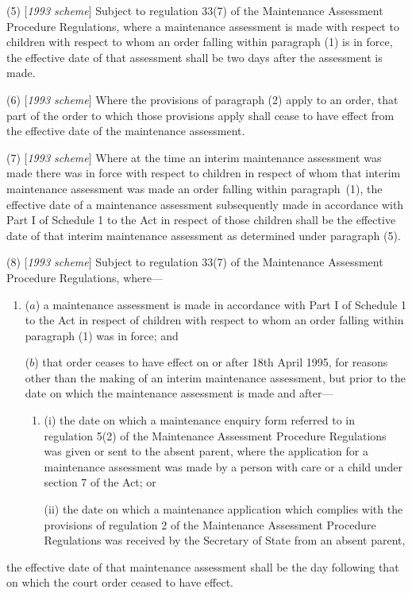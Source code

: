 \documentclass[12pt,a4paper]{article}
\begin{document}
(5) [\emph{1993 scheme}]
Subject to regulation 33(7) of the Maintenance Assessment Procedure Regulations,  %
where a maintenance assessment is made with respect to children with respect to whom an order falling within paragraph (1) is in force, the effective date of that assessment shall be two days after the assessment is made.

(6) [\emph{1993 scheme}] Where the provisions of paragraph (2) apply to an order, that part of the order to which those provisions apply shall cease to have effect from the effective date of the maintenance assessment.

(7) [\emph{1993 scheme}] Where at the time an interim maintenance assessment was made there was in force with respect to children in respect of whom that interim maintenance assessment was made an order falling within paragraph~(1), the effective date of a maintenance assessment subsequently made in accordance with Part I of Schedule 1 to the Act in respect of those children shall be the effective date of that interim maintenance assessment as determined under paragraph (5).

(8) [\emph{1993 scheme}] 
Subject to regulation 33(7) of the Maintenance Assessment Procedure Regulations,  %
where—
\begin{enumerate}\item[]
($a$) a maintenance assessment is made in accordance with Part I of Schedule 1 to the Act in respect of children with respect to whom an order falling within paragraph (1) was in force; and

($b$) that order ceases to have effect on or after 18th April 1995, for reasons other than the making of an interim maintenance assessment, but prior to the date on which the maintenance assessment is made and after—
\begin{enumerate}\item[]
(i) the date on which a maintenance enquiry form referred to in regulation 5(2) of the Maintenance Assessment Procedure Regulations was given or sent to the absent parent, where the application for a maintenance assessment was made by a person with care or a child under section 7 of the Act; or

(ii) the date on which a maintenance application which complies with the provisions of regulation 2 of the Maintenance Assessment Procedure Regulations was received by the Secretary of State from an absent parent,
\end{enumerate}
\end{enumerate}
the effective date of that maintenance assessment shall be the day following that on which the court order ceased to have effect.
\end{document}
